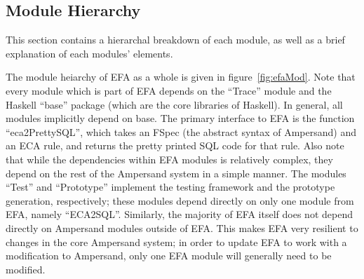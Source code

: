 \documentclass[12pt, svgnames]{article}
\let\Oldsubsection\subsection
\renewcommand{\subsection}{\FloatBarrier\Oldsubsection}
\begin{document}
\subsection{Module Hierarchy}

This section contains a hierarchal breakdown of each module, as well as a brief
explanation of each modules' elements. 

The module heiarchy of EFA as a whole is given in figure~\ref{fig:efaMod}. Note
that every module which is part of EFA depends on the ``Trace'' module and the
Haskell ``base'' package (which are the core libraries of Haskell). In general,
all modules implicitly depend on base. The primary interface to EFA is the
function ``eca2PrettySQL'', which takes an FSpec (the abstract syntax of
Ampersand) and an ECA rule, and returns the pretty printed SQL code for that
rule. Also note that while the dependencies within EFA modules is relatively
complex, they depend on the rest of the Ampersand system in a simple manner. The
modules ``Test'' and ``Prototype'' implement the testing framework and the
prototype generation, respectively; these modules depend directly on only one
module from EFA, namely ``ECA2SQL''. Similarly, the majority of EFA itself does
not depend directly on Ampersand modules outside of EFA. This makes EFA very
resilient to changes in the core Ampersand system; in order to update EFA
to work with a modification to Ampersand, only one EFA module will generally need 
to be modified. 
\end{document}
